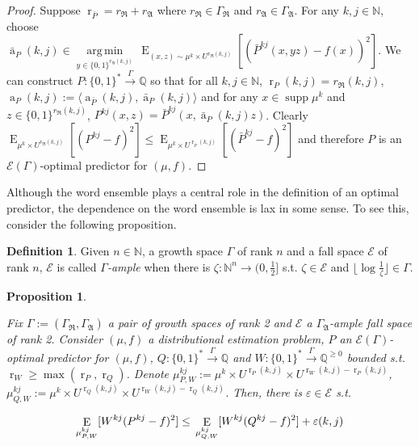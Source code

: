 \documentclass{article}
\numberwithin{equation}{section}
\theoremstyle{definition}
\newtheorem{definition}{Definition}[section]
\theoremstyle{plain}
\newtheorem{proposition}{Proposition}[section]
\newcommand{\Words}{{\{ 0, 1 \}^*}}
\newcommand{\WordsLen}[1]{{\{ 0, 1 \}^{#1}}}
\DeclareMathOperator{\Supp}{supp}
\DeclareMathOperator{\E}{E}
\DeclareMathOperator{\R}{r}
\DeclareMathOperator{\A}{a}
\newcommand{\Argmin}[1]{\underset{#1}{\operatorname{arg\,min}}\,}
\newcommand{\Nats}{\mathbb{N}}
\newcommand{\Rats}{\mathbb{Q}}
\newcommand{\Floor}[1]{\lfloor #1 \rfloor}
\newcommand{\Chev}[1]{\langle #1 \rangle}
\begin{document}
\begin{proof}

Suppose $\R_{\bar{P}}=r_{\mathfrak{R}}+r_{\mathfrak{A}}$ where $r_{\mathfrak{R}} \in \Gamma_{\mathfrak{R}}$ and $r_{\mathfrak{A}} \in \Gamma_{\mathfrak{A}}$. For any ${k,j \in \Nats}$, choose ${\bar{\A}_P(k,j) \in \Argmin{y \in \WordsLen{r_{\mathfrak{A}}(k,j)}} \E_{(x,z) \sim \mu^k \times U^{r_{\mathfrak{R}}(k,j)}}[(\bar{P}^{kj}(x,yz) - f(x))^2]}$. We can construct $P: \Words \xrightarrow{\Gamma} \Rats$ so that for all $k,j \in \Nats$, $\R_P(k,j) = r_{\mathfrak{R}}(k,j)$, $\A_P(k,j):=\Chev{\A_{\bar{P}}(k,j),\bar{\A}_P(k,j)}$ and for any $x \in \Supp \mu^k$ and $z \in \WordsLen{r_{\mathfrak{R}}(k,j)}$, ${P^{kj}(x,z)=\bar{P}^{kj}(x,\bar{\A}_P(k,j)z)}$. Clearly ${\E_{\mu^k \times U^{r_{\mathfrak{R}}(k,j)}}[(P^{kj} - f)^2] \leq \E_{\mu^k \times U^{\R_{\bar{P}}(k,j)}}[(\bar{P}^{kj} - f)^2]}$ and therefore $P$ is an $\mathcal{E}(\Gamma)$-optimal predictor for $(\mu,f)$.

\end{proof}

Although the word ensemble plays a central role in the definition of an optimal predictor, the dependence on the word ensemble is lax in some sense. To see this, consider the following proposition.

\begin{definition}

Given $n \in \Nats$, a growth space $\Gamma$ of rank $n$ and a fall space $\mathcal{E}$ of rank $n$, $\mathcal{E}$ is called \emph{$\Gamma$-ample} when there is $\zeta: \Nats^n \rightarrow (0,\frac{1}{2}]$ s.t.  $\zeta \in \mathcal{E}$ and $\Floor{\log \frac{1}{\zeta}} \in \Gamma$.

\end{definition}

\begin{proposition}
\label{prp:weight}

Fix $\Gamma:=(\Gamma_{\mathfrak{R}},\Gamma_{\mathfrak{A}})$ a pair of growth spaces of rank 2 and $\mathcal{E}$ a $\Gamma_{\mathfrak{A}}$-ample fall space of rank 2. Consider $(\mu,f)$ a distributional estimation problem, $P$ an $\mathcal{E}(\Gamma)$-optimal predictor for $(\mu,f)$, $Q: \Words \xrightarrow{\Gamma} \Rats$ and ${W: \Words \xrightarrow{\Gamma} \Rats^{\geq 0}}$ bounded s.t. $\R_W \geq \max(\R_P, \R_Q)$. Denote ${\mu^{kj}_{P,W}:=\mu^k \times U^{\R_P(k,j)} \times U^{\R_W(k,j)-\R_P(k,j)}}$, ${\mu^{kj}_{Q,W}:=\mu^k \times U^{\R_Q(k,j)} \times U^{\R_W(k,j)-\R_Q(k,j)}}$. Then, there is $\varepsilon \in \mathcal{E}$ s.t.

\begin{equation}
\E_{\mu^{kj}_{P,W}}[W^{kj}(P^{kj} - f)^2] \leq \\ \E_{\mu^{kj}_{Q,W}}[W^{kj}(Q^{kj} - f)^2] + \varepsilon(k,j)
\end{equation}

\end{proposition}
\end{document}
